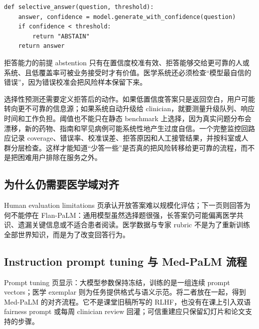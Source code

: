 \begin{lstlisting}[caption={选择性预测的阈值化流程（示意）}]
def selective_answer(question, threshold):
    answer, confidence = model.generate_with_confidence(question)
    if confidence < threshold:
        return "ABSTAIN"
    return answer
\end{lstlisting}

\begin{importantbox}{拒答能力的前提}
abstention 只有在置信度校准有效、拒答能够交给更可靠的人或系统、且低覆盖率可被业务接受时才有价值。医学系统还必须检查“模型最自信的错误”，因为错误校准会把风险样本保留下来。
\end{importantbox}

选择性预测还需要定义拒答后的动作。如果低置信度答案只是返回空白，用户可能转向更不可靠的信息源；如果系统自动升级给 clinician，就要测量升级队列、响应时间和工作负担。阈值也不能只在静态 benchmark 上选择，因为真实问题分布会漂移，新的药物、指南和罕见病例可能系统性地产生过度自信。一个完整监控回路应记录 coverage、错误率、校准误差、拒答原因和人工接管结果，并按科室或人群分层检查。这样才能知道“少答一些”是否真的把风险转移给更可靠的流程，而不是把困难用户排除在服务之外。

\subsection{为什么仍需要医学域对齐}

Human evaluation limitations 页承认开放答案难以规模化评估；下一页则回答为何不能停在 Flan-PaLM：通用模型虽然选择题很强，长答案仍可能偏离医学共识、遗漏关键信息或不适合患者阅读。医学数据与专家 rubric 不是为了重新训练全部世界知识，而是为了改变回答行为。



\subsection{Instruction prompt tuning 与 Med-PaLM 流程}

Prompt tuning 页显示：大模型参数保持冻结，训练的是一组连续 prompt vectors；医学 exemplar 则为任务提供格式与语义示范。将二者放在一起，得到 Med-PaLM 的对齐流程。它不是课堂旧稿所写的 RLHF，也没有在课上引入双语 fairness prompt 或每周 clinician review 回灌；可信重建应只保留幻灯片和论文支持的步骤。

